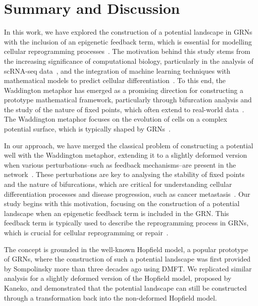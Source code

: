 \documentclass[reprint,amsmath,amssymb,aps]{revtex4-2}
\begin{document}
\section{Summary and Discussion}\label{Summary}
In this work, we have explored the construction of a potential landscape in GRNs with the inclusion of an epigenetic feedback term, which is essential for modelling cellular reprogramming processes~\cite{KanekoPRR2020,kaneko2007evolution}. The motivation behind this study stems from the increasing significance of computational biology, particularly in the analysis of scRNA-seq data~\cite{Klein1}, and the integration of machine learning techniques with mathematical models to predict cellular differentiation~\cite{Briscoe1,Briscoe2,Raju1,Raju2,Raju3}. To this end, the Waddington metaphor has emerged as a promising direction for constructing a prototype mathematical framework, particularly through bifurcation analysis and the study of the nature of fixed points, which often extend to real-world data~\cite{Waddington,Briscoe1,Briscoe2,Raju1,Raju2,Raju3}. The Waddington metaphor focuses on the evolution of cells on a complex potential surface, which is typically shaped by GRNs~\cite{Waddington,Briscoe1,Briscoe2,Raju1,Raju2,Raju3}.

In our approach, we have merged the classical problem of constructing a potential well with the Waddington metaphor, extending it to a slightly deformed version when various perturbations--such as feedback mechanisms--are present in the network~\cite{KanekoPRR2020,kaneko2007evolution,matsushita2022dynamical,miyamoto2015pluripotency}. These perturbations are key to analysing the stability of fixed points and the nature of bifurcations, which are critical for understanding cellular differentiation processes and disease progression, such as cancer metastasis~\cite{Mohit,Mohit2}. Our study begins with this motivation, focusing on the construction of a potential landscape when an epigenetic feedback term is included in the GRN. This feedback term is typically used to describe the reprogramming process in GRNs, which is crucial for cellular reprogramming or repair~\cite{KanekoPRR2020,kaneko2007evolution,matsushita2022dynamical,miyamoto2015pluripotency}.

The concept is grounded in the well-known Hopfield model, a popular prototype of GRNs, where the construction of such a potential landscape was first provided by Sompolinsky more than three decades ago using DMFT. We replicated similar analysis for a slightly deformed version of the Hopfield model, proposed by Kaneko, and demonstrated that the potential landscape can still be constructed through a transformation back into the non-deformed Hopfield model.
\end{document}
